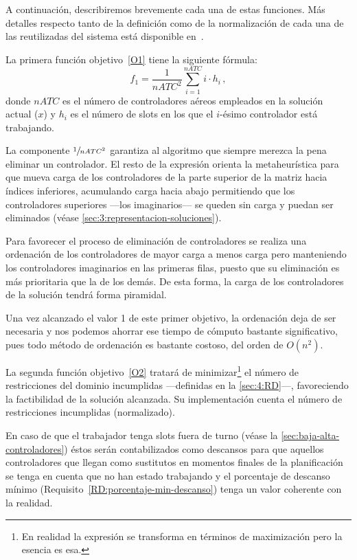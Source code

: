 A continuación, describiremos brevemente cada una de estas funciones. Más detalles respecto tanto de la definición como de la normalización de cada una de las reutilizadas del sistema \legacy{} está disponible en~\cite{articulo2}.

La primera función objetivo~\ref{O1} tiene la siguiente fórmula:
\[ f_1 = \frac{1}{nATC^2} \sum_{i=1}^{nATC} i\cdot h_i \,, \]
donde $nATC$ es el número de controladores aéreos empleados en la solución actual ($x$) y $h_i$ es el número de slots en los que el $i$-ésimo controlador está trabajando. 

La componente $\sfrac{1}{nATC^2}$ garantiza al algoritmo que siempre merezca la pena eliminar un controlador. El resto de la expresión orienta la metaheurística para que mueva carga de los controladores de la parte superior de la matriz hacia índices inferiores, acumulando carga hacia abajo permitiendo que los controladores superiores ---los imaginarios--- se queden sin carga y puedan ser eliminados (véase \autoref{sec:3:representacion-soluciones}).

Para favorecer el proceso de eliminación de controladores se realiza una ordenación de los controladores de mayor carga a menos carga pero manteniendo los controladores imaginarios en las primeras filas, puesto que su eliminación es más prioritaria que la de los demás. De esta forma, la carga de los controladores de la solución tendrá forma piramidal.

Una vez alcanzado el valor 1 de este primer objetivo, la ordenación deja de ser necesaria y nos podemos ahorrar ese tiempo de cómputo bastante significativo, pues todo método de ordenación es bastante costoso, del orden de $O(n^2)$.  %

La segunda función objetivo~\ref{O2} tratará de minimizar\footnote{En realidad la expresión se transforma en términos de maximización pero la esencia es esa.} el número de restricciones del dominio incumplidas ---definidas en la \autoref{sec:4:RD}---, favoreciendo la factibilidad de la solución alcanzada. Su implementación cuenta el número de restricciones incumplidas (normalizado).

En caso de que el trabajador tenga slots fuera de turno (véase la \autoref{sec:baja-alta-controladores}) éstos serán contabilizados como descansos para que aquellos controladores que llegan como sustitutos en momentos finales de la planificación se tenga en cuenta que no han estado trabajando y el porcentaje de descanso mínimo (Requisito~\ref{RD:porcentaje-min-descanso}) tenga un valor coherente con la realidad.

